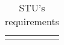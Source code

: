 \begin{longtable}[H]{l p{6.5cm} l p{3cm}}
                 &                                                                                                                                                                                                                       &                      &                                                                                         \\
    \hline
    \caption{STU's requirements}
\end{longtable}
